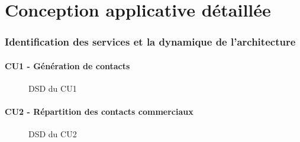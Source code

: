 \part{Conception applicative détaillée}

\section{Identification des services et la dynamique de l’architecture}


\subsection{CU1 - Génération de contacts}
\begin{figure}[H]
\noindent{}
\caption{DSD du CU1}
\end{figure}

\subsection{CU2 - Répartition des contacts commerciaux}
\begin{figure}[H]
\noindent{}
\caption{DSD du CU2}
\end{figure}


